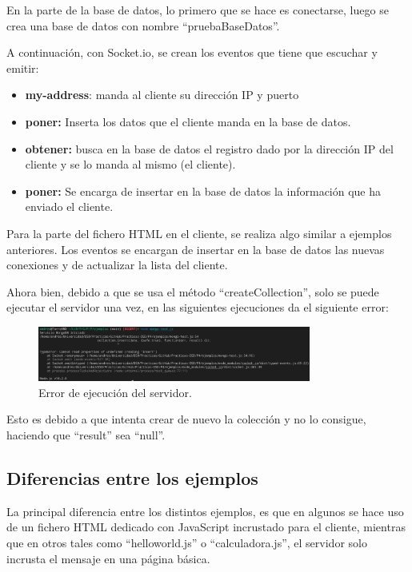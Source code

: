 \documentclass{article}
\begin{document}
En la parte de la base de datos, lo primero que se hace es conectarse, luego se crea una base de datos con nombre ``pruebaBaseDatos''.

A continuación, con Socket.io, se crean los eventos que tiene que escuchar y emitir: 

\begin{itemize}
    \item \textbf{my-address}: manda al cliente su dirección IP y puerto
    \item \textbf{poner:} Inserta los datos que el cliente manda en la base de datos.
    \item \textbf{obtener:} busca en la base de datos el registro dado por la dirección IP del cliente y se lo manda al mismo (el cliente).
    \item \textbf{poner:} Se encarga de insertar en la base de datos la información que ha enviado el cliente.
\end{itemize}

Para la parte del fichero HTML en el cliente, se realiza algo similar a ejemplos anteriores. Los eventos se encargan de insertar en la base de datos las nuevas conexiones y de actualizar la lista del cliente.

Ahora bien, debido a que se usa el método ``createCollection'', solo se puede ejecutar el servidor una vez, en las siguientes ejecuciones da el siguiente error:

\begin{figure}[H]
    \centering
    \includegraphics[width=0.8\textwidth]{images/errormongo.png}
    \caption{Error de ejecución del servidor.}
\end{figure}

Esto es debido a que intenta crear de nuevo la colección y no lo consigue, haciendo que ``result'' sea ``null''.

\subsection{Diferencias entre los ejemplos}
La principal diferencia entre los distintos ejemplos, es que en algunos se hace uso de un fichero HTML dedicado con JavaScript incrustado para el cliente, mientras que en otros tales como ``helloworld.js'' o ``calculadora.js'', el servidor solo incrusta el mensaje en una página básica.
\end{document}
